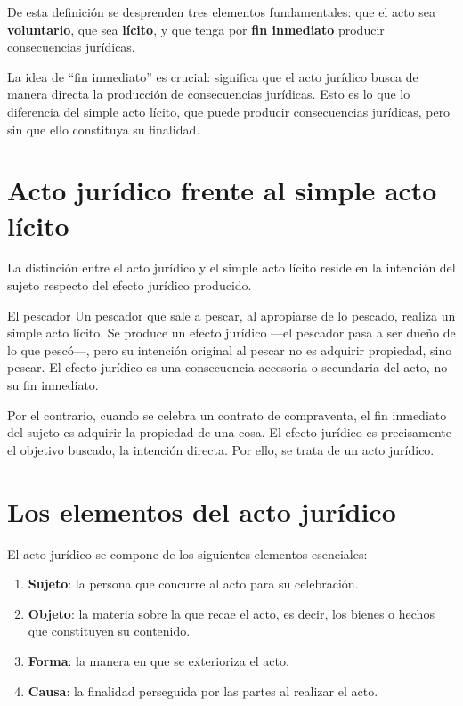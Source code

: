 \documentclass[12pt,oneside]{book}
\begin{document}
De esta definición se desprenden tres elementos fundamentales: que el acto sea \textbf{voluntario}, que sea \textbf{lícito}, y que tenga por \textbf{fin inmediato} producir consecuencias jurídicas.

\begin{important}
La idea de ``fin inmediato'' es crucial: significa que el acto jurídico busca de manera directa la producción de consecuencias jurídicas. Esto es lo que lo diferencia del simple acto lícito, que puede producir consecuencias jurídicas, pero sin que ello constituya su finalidad.
\end{important}

\section{Acto jurídico frente al simple acto lícito}

La distinción entre el acto jurídico y el simple acto lícito reside en la intención del sujeto respecto del efecto jurídico producido.

\begin{example}{El pescador}
Un pescador que sale a pescar, al apropiarse de lo pescado, realiza un simple acto lícito. Se produce un efecto jurídico —el pescador pasa a ser dueño de lo que pescó—, pero su intención original al pescar no es adquirir propiedad, sino pescar. El efecto jurídico es una consecuencia accesoria o secundaria del acto, no su fin inmediato.

Por el contrario, cuando se celebra un contrato de compraventa, el fin inmediato del sujeto es adquirir la propiedad de una cosa. El efecto jurídico es precisamente el objetivo buscado, la intención directa. Por ello, se trata de un acto jurídico.
\end{example}

\section{Los elementos del acto jurídico}

El acto jurídico se compone de los siguientes elementos esenciales:

\begin{enumerate}
    \item \textbf{Sujeto}: la persona que concurre al acto para su celebración.
    \item \textbf{Objeto}: la materia sobre la que recae el acto, es decir, los bienes o hechos que constituyen su contenido.
    \item \textbf{Forma}: la manera en que se exterioriza el acto.
    \item \textbf{Causa}: la finalidad perseguida por las partes al realizar el acto.
\end{enumerate}
\end{document}

